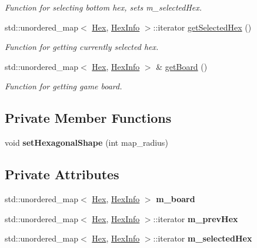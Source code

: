 \begin{DoxyCompactItemize}
\begin{DoxyCompactList}\small\item\em Function for selecting bottom hex, sets m\+\_\+selected\+Hex. \end{DoxyCompactList}\item 
std\+::unordered\+\_\+map$<$ \hyperlink{classHex}{Hex}, \hyperlink{structHexInfo}{Hex\+Info} $>$\+::iterator \hyperlink{classBoard_ad8eb316c6eb56a92ba3760fe898e7387}{get\+Selected\+Hex} ()
\begin{DoxyCompactList}\small\item\em Function for getting currently selected hex. \end{DoxyCompactList}\item 
std\+::unordered\+\_\+map$<$ \hyperlink{classHex}{Hex}, \hyperlink{structHexInfo}{Hex\+Info} $>$ \& \hyperlink{classBoard_a7fd500374a12179b5be2842add8e23ce}{get\+Board} ()
\begin{DoxyCompactList}\small\item\em Function for getting game board. \end{DoxyCompactList}\end{DoxyCompactItemize}
\subsection*{Private Member Functions}
\begin{DoxyCompactItemize}
\item 
void {\bfseries set\+Hexagonal\+Shape} (int map\+\_\+radius)\hypertarget{classBoard_ab948e11f0c0e881a784601eb4c9d7901}{}\label{classBoard_ab948e11f0c0e881a784601eb4c9d7901}

\end{DoxyCompactItemize}
\subsection*{Private Attributes}
\begin{DoxyCompactItemize}
\item 
std\+::unordered\+\_\+map$<$ \hyperlink{classHex}{Hex}, \hyperlink{structHexInfo}{Hex\+Info} $>$ {\bfseries m\+\_\+board}\hypertarget{classBoard_a3f1155ac66a6cb3fe4d769860f0aba3b}{}\label{classBoard_a3f1155ac66a6cb3fe4d769860f0aba3b}

\item 
std\+::unordered\+\_\+map$<$ \hyperlink{classHex}{Hex}, \hyperlink{structHexInfo}{Hex\+Info} $>$\+::iterator {\bfseries m\+\_\+prev\+Hex}\hypertarget{classBoard_a4199477dd54758f6b278d566792645c5}{}\label{classBoard_a4199477dd54758f6b278d566792645c5}

\item 
std\+::unordered\+\_\+map$<$ \hyperlink{classHex}{Hex}, \hyperlink{structHexInfo}{Hex\+Info} $>$\+::iterator {\bfseries m\+\_\+selected\+Hex}\hypertarget{classBoard_a0d1187868dd04c5eb7c2cbfeed42203d}{}\label{classBoard_a0d1187868dd04c5eb7c2cbfeed42203d}

\end{DoxyCompactItemize}


